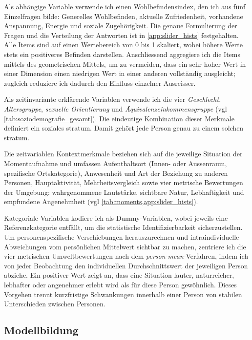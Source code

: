 Als abhängige Variable verwende ich einen Wohlbefindensindex, den ich aus fünf Einzelfragen bilde: Generelles Wohlbefinden, aktuelle Zufriedenheit, vorhandene Anspannung, Energie und soziale Zugehörigkeit. Die genaue Formulierung der Fragen und die Verteilung der Antworten ist in \cref{app:slider_hists} festgehalten. Alle Items sind auf einen Wertebereich von 0 bis 1 skaliert, wobei höhere Werte stets ein positiveres Befinden darstellen. Anschliessend aggregiere ich die Items mittels des geometrischen Mittels, um zu vermeiden, dass ein sehr hoher Wert in einer Dimension einen niedrigen Wert in einer anderen vollständig ausgleicht; zugleich reduziere ich dadurch den Einfluss einzelner Ausreisser.

Als zeitinvariante erklärende Variablen verwende ich die vier  \emph{Geschlecht}, \emph{Altersgruppe}, \emph{sexuelle Orientierung} und \emph{Äquivalenzeinkommensgruppe} (\gls{vgl} \cref{tab:soziodemografie_gesamt}). Die eindeutige Kombination dieser Merkmale definiert ein soziales \gls{stratum}. Damit gehört jede Person genau zu einem solchen \gls{stratum}.

Die zeitvariablen Kontextmerkmale beziehen sich auf die jeweilige Situation der Momentaufnahme und umfassen Aufenthaltsort (Innen- oder Aussenraum, spezifische Ortskategorie), Anwesenheit und Art der Beziehung zu anderen Personen, Hauptaktivität, Mehrheitsvergleich sowie vier metrische Bewertungen der Umgebung: wahrgenommene Lautstärke, sichtbare Natur, Lebhaftigkeit und empfundene Angenehmheit (\gls{vgl} \cref{tab:moments,app:slider_hists}).

Kategoriale Variablen kodiere ich als Dummy-Variablen, wobei jeweils eine Referenzkategorie entfällt, um die statistische Identifizierbarkeit sicherzustellen. Um personenspezifische Verschiebungen herauszurechnen und intraindividuelle Abweichungen vom persönlichen Mittelwert sichtbar zu machen, zentriere ich die vier metrischen Umweltbewertungen nach dem \emph{person-mean}-Verfahren, indem ich von jeder Beobachtung den individuellen Durchschnittswert der jeweiligen Person abziehe. Ein positiver Wert zeigt an, dass eine Situation lauter, naturreicher, lebhafter oder angenehmer erlebt wird als für diese Person gewöhnlich. Dieses Vorgehen trennt kurzfristige Schwankungen innerhalb einer Person von stabilen Unterschieden zwischen Personen.

\subsection*{Modellbildung}

